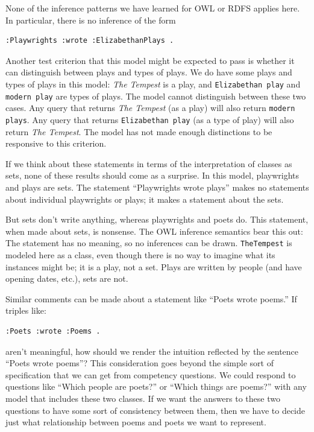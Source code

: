 None of the inference patterns we have learned for OWL or RDFS applies
here. In particular, there is no inference of the form

\begin{lstlisting}
:Playwrights :wrote :ElizabethanPlays .
\end{lstlisting}

Another test criterion that this model might be expected to pass is
whether it can distinguish between plays and types of plays. We do have
some plays and types of plays in this model: \emph{The Tempest} is a play, and
\texttt{Elizabethan play} and \texttt{modern play} are types of plays. The model cannot
distinguish between these two cases. Any query that returns \emph{The Tempest}
(as a play) will also return \texttt{modern plays}. Any query that returns
\texttt{Elizabethan play} (as a type of play) will also return \emph{The Tempest}. The
model has not made enough distinctions to be responsive to this
criterion.

If we think about these statements in terms of the interpretation of
classes as sets, none of these results should come as a surprise. In
this model, playwrights and plays are sets. The statement
``Playwrights wrote plays'' makes no statements about individual
playwrights or plays; it makes a statement about the sets.

But sets don't write anything, whereas playwrights and poets do. This
statement, when made about sets, is nonsense. The OWL inference
semantics bear this out: The statement has no meaning, so no inferences
can be drawn. \texttt{TheTempest} is modeled here as a class, even though there
is no way to imagine what its instances might be; it is a play, not a
set. Plays are written by people (and have opening dates, etc.), sets are
not.

Similar comments can be made about a statement like ``Poets wrote
poems.'' If triples like:

\begin{lstlisting}
:Poets :wrote :Poems .
\end{lstlisting}

aren't meaningful, how should we render the intuition reflected by the
sentence ``Poets wrote poems''? This consideration goes beyond the
simple sort of specification that we can get from competency questions.
We could respond to questions like ``Which people are poets?'' or
``Which things are poems?'' with any model that includes these two
classes. If we want the answers to these two questions to have some sort
of consistency between them, then we have to decide just what
relationship between poems and poets we want to represent.


